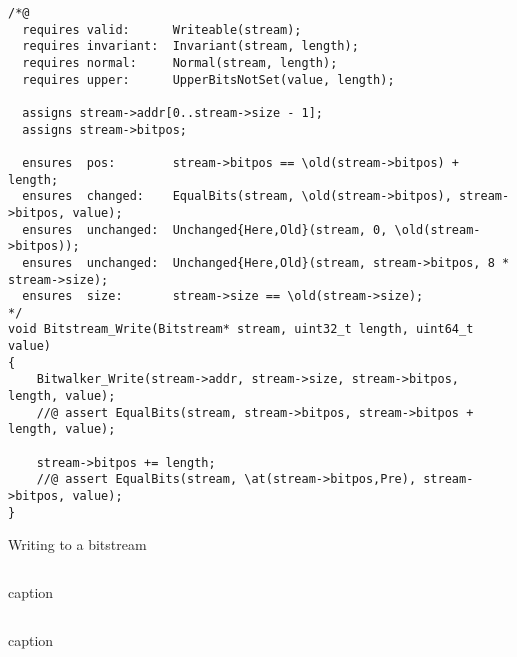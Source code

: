\begin{listing}[hbt]
\begin{minipage}{0.99\textwidth}
\begin{lstlisting}[style=acsl-block]
/*@
  requires valid:      Writeable(stream);
  requires invariant:  Invariant(stream, length);
  requires normal:     Normal(stream, length);
  requires upper:      UpperBitsNotSet(value, length);

  assigns stream->addr[0..stream->size - 1];
  assigns stream->bitpos;

  ensures  pos:        stream->bitpos == \old(stream->bitpos) + length;
  ensures  changed:    EqualBits(stream, \old(stream->bitpos), stream->bitpos, value);
  ensures  unchanged:  Unchanged{Here,Old}(stream, 0, \old(stream->bitpos));
  ensures  unchanged:  Unchanged{Here,Old}(stream, stream->bitpos, 8 * stream->size);
  ensures  size:       stream->size == \old(stream->size);
*/
void Bitstream_Write(Bitstream* stream, uint32_t length, uint64_t value)
{
    Bitwalker_Write(stream->addr, stream->size, stream->bitpos, length, value);
    //@ assert EqualBits(stream, stream->bitpos, stream->bitpos + length, value);

    stream->bitpos += length;
    //@ assert EqualBits(stream, \at(stream->bitpos,Pre), stream->bitpos, value);
}

\end{lstlisting}
\end{minipage}
\caption{\label{lst:Bitstream_Write impl}Writing to a bitstream}
\end{listing}







\begin{listing}[hbt]
\begin{minipage}{0.99\textwidth}
\begin{lstlisting}[style=acsl-block]

\end{lstlisting}
\end{minipage}
\caption{caption}
\end{listing}



\begin{listing}[hbt]
\begin{minipage}{0.99\textwidth}
\begin{lstlisting}[style=acsl-block]

\end{lstlisting}
\end{minipage}
\caption{caption}
\end{listing}



